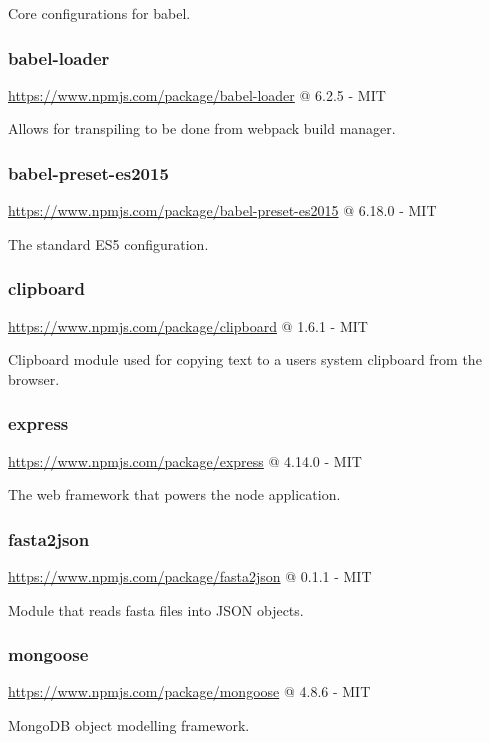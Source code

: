 Core configurations for babel.


\subsubsection*{babel-loader}

\url{https://www.npmjs.com/package/babel-loader} @ 6.2.5 - MIT

Allows for transpiling to be done from webpack build manager.

\subsubsection*{babel-preset-es2015}

\url{https://www.npmjs.com/package/babel-preset-es2015} @ 6.18.0 - MIT

The standard ES5 configuration.

\subsubsection*{clipboard}

\url{https://www.npmjs.com/package/clipboard} @ 1.6.1 - MIT

Clipboard module used for copying text to a users system clipboard from the browser.


\subsubsection*{express}

\url{https://www.npmjs.com/package/express} @ 4.14.0 - MIT

The web framework that powers the node application.

\subsubsection*{fasta2json}

\url{https://www.npmjs.com/package/fasta2json} @ 0.1.1 - MIT

Module that reads fasta files into JSON objects.

\subsubsection*{mongoose}

\url{https://www.npmjs.com/package/mongoose} @ 4.8.6 - MIT

MongoDB object modelling framework.

